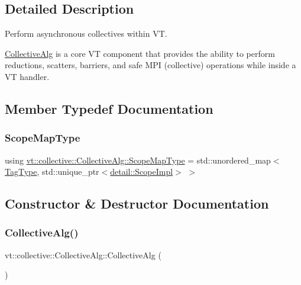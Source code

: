 \subsection{Detailed Description}
Perform asynchronous collectives within VT. 

\hyperlink{structvt_1_1collective_1_1_collective_alg}{Collective\+Alg} is a core VT component that provides the ability to perform reductions, scatters, barriers, and safe M\+PI (collective) operations while inside a VT handler. 

\subsection{Member Typedef Documentation}
\mbox{\label{structvt_1_1collective_1_1_collective_alg_abf644b20fe35cf654f5d4a6702ef5183}} 
\subsubsection{\texorpdfstring{Scope\+Map\+Type}{ScopeMapType}}
{\footnotesize\ttfamily using \hyperlink{structvt_1_1collective_1_1_collective_alg_abf644b20fe35cf654f5d4a6702ef5183}{vt\+::collective\+::\+Collective\+Alg\+::\+Scope\+Map\+Type} =  std\+::unordered\+\_\+map$<$\hyperlink{namespacevt_a84ab281dae04a52a4b243d6bf62d0e52}{Tag\+Type}, std\+::unique\+\_\+ptr$<$\hyperlink{structvt_1_1collective_1_1detail_1_1_scope_impl}{detail\+::\+Scope\+Impl}$>$ $>$\hspace{0.3cm}{\ttfamily [private]}}



\subsection{Constructor \& Destructor Documentation}
\mbox{\label{structvt_1_1collective_1_1_collective_alg_aa137479fb6afcfa33e73592ea3cbbcd8}} 
\subsubsection{\texorpdfstring{Collective\+Alg()}{CollectiveAlg()}}
{\footnotesize\ttfamily vt\+::collective\+::\+Collective\+Alg\+::\+Collective\+Alg (\begin{DoxyParamCaption}{ }\end{DoxyParamCaption})}



